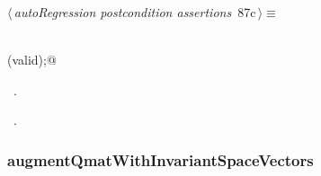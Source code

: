 \documentclass{article}
\begin{document}
\begin{flushleft} \small
\begin{minipage}{\linewidth}\label{scrap150}\raggedright\small
{} $\langle\,${\itshape autoRegression postcondition assertions}\nobreak\ {\footnotesize {87c}}$\,\rangle\equiv$
\vspace{-1ex}
\begin{list}{}{} \item
\mbox{}\verb@@\\
\mbox{}\verb@sparseAimAssert(valid);@\\
\mbox{}\verb@@{\NWsep}
\end{list}
\vspace{-1.5ex}
\footnotesize
\begin{list}{}{\setlength{\itemsep}{-\parsep}\setlength{\itemindent}{-\leftmargin}}
\item \NWtxtMacroDefBy\ .
\item \NWtxtMacroRefIn\ .

\item{}
\end{list}
\end{minipage}\vspace{4ex}
\end{flushleft}
\subsubsection{augmentQmatWithInvariantSpaceVectors}
\end{document}
